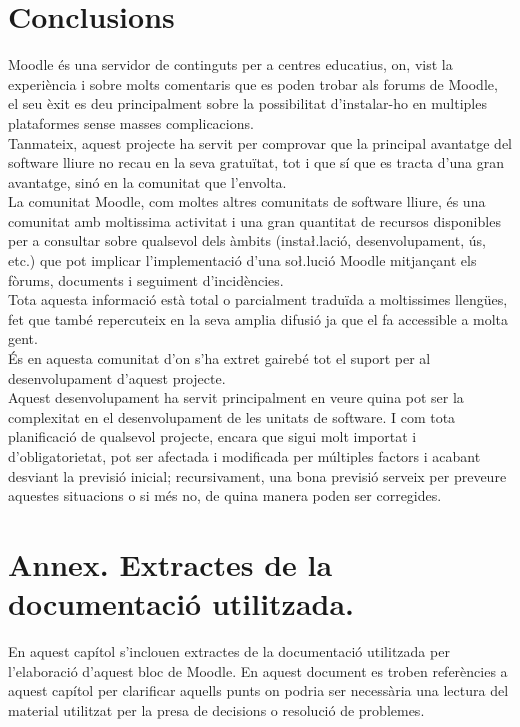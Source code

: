\documentclass[a4paper]{report}  %
\begin{document}
\chapter{Conclusions}
Moodle és una servidor de continguts per a centres educatius, on, vist la experiència i sobre molts comentaris que es poden trobar als forums de Moodle, el seu èxit es deu principalment sobre la possibilitat d'instalar-ho en multiples plataformes sense masses complicacions.\\ 
Tanmateix, aquest projecte ha servit per comprovar que la principal avantatge del software lliure no recau en la seva gratuïtat, tot i que sí que es tracta d'una gran avantatge, sinó en la comunitat que l'envolta.\\
La comunitat Moodle, com moltes altres comunitats de software lliure, és una comunitat amb moltissima activitat i una gran quantitat de recursos disponibles per a consultar sobre qualsevol dels àmbits (insta\l.lació, desenvolupament, ús, etc.) que pot implicar l'implementació d'una so\l.lució Moodle mitjançant els fòrums, documents i seguiment d'incidències. \\
Tota aquesta informació està total o parcialment traduïda a moltissimes llengües, fet que també repercuteix en la seva amplia difusió ja que el fa accessible a molta gent.\\
És en aquesta comunitat d'on s'ha extret gairebé tot el suport per al desenvolupament d'aquest projecte.\\
Aquest desenvolupament ha servit principalment en veure quina pot ser la complexitat en el desenvolupament de les unitats de software. I com tota planificació de qualsevol projecte, encara que sigui molt importat i d'obligatorietat, pot ser afectada i modificada per múltiples factors i acabant desviant la previsió inicial; recursivament, una bona previsió serveix per preveure aquestes situacions o si més no, de quina manera poden ser corregides. 

\chapter{Annex. Extractes de la documentació utilitzada.}
En aquest capítol s'inclouen extractes de la documentació utilitzada per l'elaboració d'aquest bloc de Moodle. En aquest document es troben referències a aquest capítol per clarificar aquells punts on podria ser necessària una lectura del material utilitzat per la presa de decisions o resolució de problemes.
\end{document}
